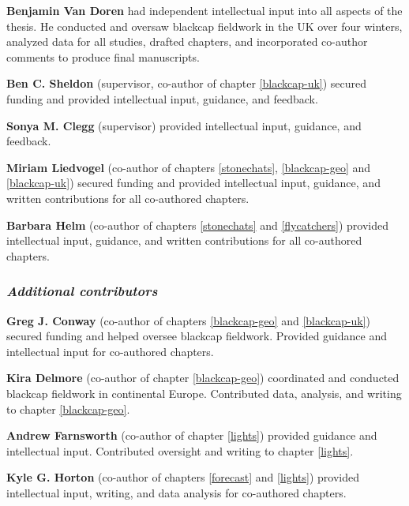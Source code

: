 \documentclass[a4paper, nobind]{templates/ociamthesis}
\begin{document}
\begin{romanpages}
\begin{contributions}
 	\textbf{Benjamin Van Doren} had independent intellectual input into all aspects of the thesis. He conducted and oversaw blackcap fieldwork in the UK over four winters, analyzed data for all studies, drafted chapters, and incorporated co-author comments to produce final manuscripts.

\vspace{8pt}

\textbf{Ben C. Sheldon} (supervisor, co-author of chapter \ref{blackcap-uk}) secured funding and provided intellectual input, guidance, and feedback.

\textbf{Sonya M. Clegg} (supervisor) provided intellectual input, guidance, and feedback.

\textbf{Miriam Liedvogel} (co-author of chapters \ref{stonechats}, \ref{blackcap-geo} and \ref{blackcap-uk}) secured funding and provided intellectual input, guidance, and written contributions for all co-authored chapters.

\textbf{Barbara Helm} (co-author of chapters \ref{stonechats} and \ref{flycatchers}) provided intellectual input, guidance, and written contributions for all co-authored chapters.

\hypertarget{additional-contributors}{%
\subsubsection{\texorpdfstring{\emph{Additional contributors}}{Additional contributors}}\label{additional-contributors}}

\textbf{Greg J. Conway} (co-author of chapters \ref{blackcap-geo} and \ref{blackcap-uk}) secured funding and helped oversee blackcap fieldwork. Provided guidance and intellectual input for co-authored chapters.

\textbf{Kira Delmore} (co-author of chapter \ref{blackcap-geo}) coordinated and conducted blackcap fieldwork in continental Europe. Contributed data, analysis, and writing to chapter \ref{blackcap-geo}.

\textbf{Andrew Farnsworth} (co-author of chapter \ref{lights}) provided guidance and intellectual input. Contributed oversight and writing to chapter \ref{lights}.

\textbf{Kyle G. Horton} (co-author of chapters \ref{forecast} and \ref{lights}) provided intellectual input, writing, and data analysis for co-authored chapters.


\end{contributions}
\end{romanpages}
\end{document}
